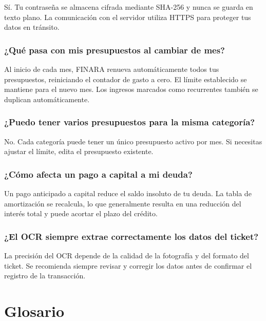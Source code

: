\documentclass[a4paper,12pt]{report}
\begin{document}
Sí. Tu contraseña se almacena cifrada mediante SHA-256 y nunca se guarda
en texto plano. La comunicación con el servidor utiliza HTTPS para
proteger tus datos en tránsito.

\subsection{¿Qué pasa con mis presupuestos al cambiar de mes?}

Al inicio de cada mes, FINARA renueva automáticamente todos tus
presupuestos, reiniciando el contador de gasto a cero. El límite
establecido se mantiene para el nuevo mes. Los ingresos marcados como
recurrentes también se duplican automáticamente.

\subsection{¿Puedo tener varios presupuestos para la misma categoría?}

No. Cada categoría puede tener un único presupuesto activo por mes. Si
necesitas ajustar el límite, edita el presupuesto existente.

\subsection{¿Cómo afecta un pago a capital a mi deuda?}

Un pago anticipado a capital reduce el saldo insoluto de tu deuda. La
tabla de amortización se recalcula, lo que generalmente resulta en una
reducción del interés total y puede acortar el plazo del crédito.

\subsection{¿El OCR siempre extrae correctamente los datos del ticket?}

La precisión del OCR depende de la calidad de la fotografía y del formato
del ticket. Se recomienda siempre revisar y corregir los datos antes de
confirmar el registro de la transacción.


\chapter{Glosario}
\end{document}

